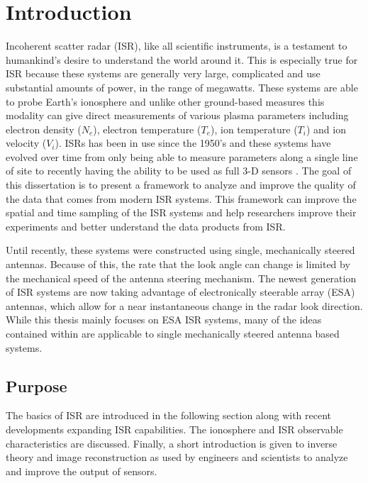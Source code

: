 \chapter{Introduction}
\label{chapter:body}
\thispagestyle{myheadings}
\setcounter{tocdepth}{1}
\graphicspath{{1_Intro/Figures/}}

Incoherent scatter radar (ISR), like all scientific instruments, is a testament to humankind's desire to understand the world around it. This is especially true for ISR because these systems are generally very large, complicated and use substantial amounts of power, in the range of megawatts. These systems are able to probe Earth's ionosphere and unlike other ground-based measures this modality can give direct measurements of various plasma parameters including electron density ($N_e$), electron temperature ($T_e$), ion temperature ($T_i$) and ion velocity ($V_i$). ISRs has been in use since the 1950's \cite{gordon58} and these systems have evolved over time from only being able to measure parameters along a single line of site to recently having the ability to be used as full 3-D sensors \cite{Semeter2009738,Nicolls:2007ie}. The goal of this dissertation is to present a framework to analyze and improve the quality of the data that comes from modern ISR systems. This framework can  improve the spatial and time sampling of the ISR systems and help researchers improve their experiments and better understand the data products from ISR.

Until recently, these systems were constructed using single, mechanically steered antennas. Because of this, the rate that the look angle can change is limited by the mechanical speed of the antenna steering mechanism. The newest generation of ISR systems are now taking advantage of electronically steerable array (ESA) antennas, which allow for a near instantaneous change in the radar look direction. While this thesis mainly focuses on ESA ISR systems, many of the ideas contained within are applicable to single mechanically steered antenna based systems. 
 
\section{Purpose}
The basics of ISR are introduced in the following section along with recent developments expanding ISR capabilities. The ionosphere and ISR observable characteristics are discussed. Finally, a short introduction is given to inverse theory and image reconstruction as used by engineers and scientists to analyze and improve the output of sensors.

